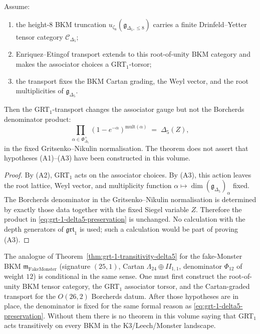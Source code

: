 \begin{theorem}
\label{thm:grt-1-transitivity-delta5}
%
%
Assume:
\begin{enumerate}[label=\textup{(A\arabic*)}]
\item the height-$8$ BKM truncation
$u_{\zeta_8}(\mathfrak g_{\Delta_5,\le8})$ carries a finite
Drinfeld--Yetter tensor category
$\mathcal C_{\Delta_5}$;
\item Enriquez--Etingof transport extends to this root-of-unity BKM
category and makes the associator choices a GRT$_1$-torsor;
\item the transport fixes the BKM Cartan grading, the Weyl vector,
and the root multiplicities of $\mathfrak g_{\Delta_5}$.
\end{enumerate}
Then the GRT$_1$-transport changes the associator gauge but not the
Borcherds denominator product:
\begin{equation}\label{eq:grt-1-delta5-preservation}
 \prod_{\alpha \in \Phi^+_{\Delta_5}}
 (1 - e^{-\alpha})^{\mathrm{mult}(\alpha)}
 \;=\;
 \Delta_5(Z),
\end{equation}
in the fixed Gritsenko--Nikulin normalisation. The theorem does not
assert that hypotheses \textup{(A1)}--\textup{(A3)} have been
constructed in this volume.
\end{theorem}

\begin{proof}
By \textup{(A2)}, GRT$_1$ acts on the associator choices. By
\textup{(A3)}, this action leaves the root lattice, Weyl vector, and
multiplicity function $\alpha\mapsto\dim
(\mathfrak g_{\Delta_5})_\alpha$ fixed. The Borcherds denominator
in the Gritsenko--Nikulin normalisation is determined by exactly
those data together with the fixed Siegel variable $Z$. Therefore
the product in \eqref{eq:grt-1-delta5-preservation} is unchanged.
No calculation with the depth generators of $\mathfrak{grt}_1$ is
used; such a calculation would be part of proving \textup{(A3)}.
\end{proof}

\begin{remark}
\label{rem:as-grt-1-fake-monster-vs-k3}
%
The analogue of Theorem~\ref{thm:grt-1-transitivity-delta5} for the
fake-Monster BKM $\mathfrak m_{\mathrm{FakeMonster}}$ (signature
$(25, 1)$, Cartan $\Lambda_{24} \oplus II_{1, 1}$, denominator
$\Phi_{12}$ of weight $12$) is conditional in the same sense. One
must first construct the root-of-unity BKM tensor category, the
GRT$_1$ associator torsor, and the Cartan-graded transport for the
$O(26,2)$ Borcherds datum. After those hypotheses are in place,
the denominator is fixed for the same formal reason as
\eqref{eq:grt-1-delta5-preservation}. Without them there is no
theorem in this volume saying that GRT$_1$ acts transitively on
every BKM in the K$3$/Leech/Monster landscape.
\end{remark}

